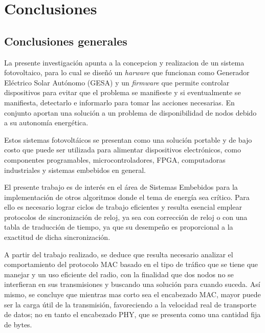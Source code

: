 
\chapter{Conclusiones} %

\label{Chapter5} %

\section{Conclusiones generales}

La presente investigación apunta a la concepcion y realizacion de un sistema fotovoltaico, para lo cual se diseñó un \textit{harware} que funcionan como Generador Eléctrico Solar Autónomo (GESA) y un \textit{firmware} que permite controlar dispositivos para evitar que el problema se manifieste y si eventualmente se manifiesta, detectarlo e informarlo para tomar las acciones necesarias. En conjunto aportan una solución a un problema de disponibilidad de nodos debido a su autonomía energética.

Estos sistemas fotovoltáicos se presentan como una solución portable y de bajo costo que puede ser utilizada para alimentar dispositivos electrónicos, como componentes programables, microcontroladores, FPGA, computadoras industriales y sistemas embebidos en general.

El presente trabajo es de interés en el área de Sistemas Embebidos para la implementación de otros algoritmos donde el tema de energía sea crítico. Para ello es necesario lograr ciclos de trabajo eficientes y resulta esencial emplear protocolos de sincronización de reloj, ya sea con corrección de reloj o con una tabla de traducción de tiempo, ya que su desempeño es proporcional a la exactitud de dicha sincronización.

A partir del trabajo realizado, se deduce que resulta necesario analizar el comportamiento del protocolo MAC basado en el tipo de tráfico que se tiene que manejar y un uso eficiente del radio, con la finalidad que dos nodos no se interfieran en sus transmisiones y buscando una solución para cuando suceda. Así mismo, se concluye que mientras mas corto sea el encabezado MAC, mayor puede ser la carga útil de la transmisión, favoreciendo a la velocidad real de transporte de datos; no en tanto el encabezado PHY, que se presenta como una cantidad fija de bytes.

